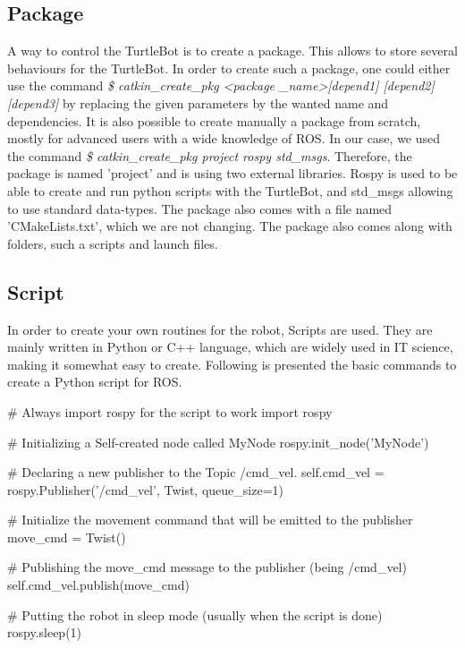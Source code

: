 \documentclass[aps,letterpaper,11pt]{revtex4}
\begin{document}
\subsection{Package}

A way to control the TurtleBot is to create a package. This allows to store several behaviours for the TurtleBot. In order to create such a package, one could either use the command 
\textit{\$ catkin\_create\_pkg \textless package \_name\textgreater [depend1] [depend2] [depend3]} by replacing the given parameters by the wanted name and dependencies. It is also possible to create manually a package from scratch, mostly for advanced users with a wide knowledge of ROS. In our case, we used the command \textit{\$ catkin\_create\_pkg project rospy std\_msgs}. Therefore, the package is named 'project' and is using two external libraries. Rospy is used to be able to create and run python scripts with the TurtleBot, and std\_msgs allowing to use standard data-types. The package also comes with a file named 'CMakeLists.txt', which we are not changing. The package also comes along with folders, such a scripts and launch files.

\subsection{Script}

In order to create your own routines for the robot, Scripts are used. They are mainly written in Python or C++ language, which are widely used in IT science, making it somewhat easy to create. Following is presented the basic commands to create a Python script for ROS.


\begin{python}
# Always import rospy for the script to work
import rospy

# Initializing a Self-created node called MyNode
rospy.init_node('MyNode')

# Declaring a new publisher to the Topic /cmd_vel. 
self.cmd_vel = rospy.Publisher('/cmd_vel', Twist, queue_size=1)
	
# Initialize the movement command that will be emitted to the publisher
move_cmd = Twist()

# Publishing the move_cmd message to the publisher (being /cmd_vel)
self.cmd_vel.publish(move_cmd)

# Putting the robot in sleep mode (usually when the script is done)
rospy.sleep(1)
\end{python}
\end{document}
